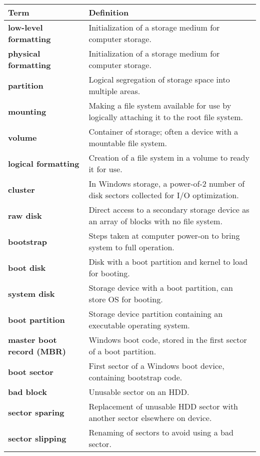 \vspace{1em}
\begin{tabular}{p{}p{}}
\toprule
\rowcolor{lightgray} \textbf{Term} & \textbf{Definition} \\
\midrule
\textbf{low-level formatting} & Initialization of a storage medium for computer storage. \\
\textbf{physical formatting} & Initialization of a storage medium for computer storage. \\
\textbf{partition} & Logical segregation of storage space into multiple areas. \\
\textbf{mounting} & Making a file system available for use by logically attaching it to the root file system. \\
\textbf{volume} & Container of storage; often a device with a mountable file system. \\
\textbf{logical formatting} & Creation of a file system in a volume to ready it for use. \\
\textbf{cluster} & In Windows storage, a power-of-2 number of disk sectors collected for I/O optimization. \\
\textbf{raw disk} & Direct access to a secondary storage device as an array of blocks with no file system. \\
\textbf{bootstrap} & Steps taken at computer power-on to bring system to full operation. \\
\textbf{boot disk} & Disk with a boot partition and kernel to load for booting. \\
\textbf{system disk} & Storage device with a boot partition, can store OS for booting. \\
\textbf{boot partition} & Storage device partition containing an executable operating system. \\
\textbf{master boot record (MBR)} & Windows boot code, stored in the first sector of a boot partition. \\
\textbf{boot sector} & First sector of a Windows boot device, containing bootstrap code. \\
\textbf{bad block} & Unusable sector on an HDD. \\
\textbf{sector sparing} & Replacement of unusable HDD sector with another sector elsewhere on device. \\
\textbf{sector slipping} & Renaming of sectors to avoid using a bad sector. \\
\bottomrule
\end{tabular}

